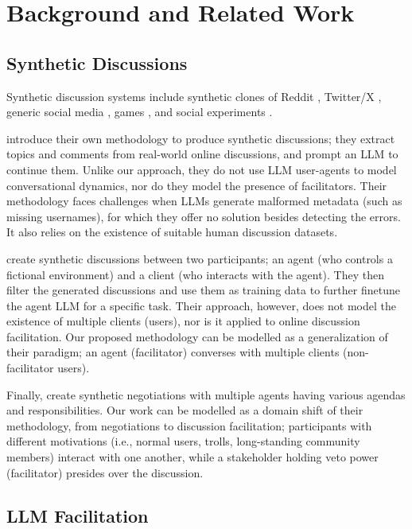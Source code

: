 %
\section{Background and Related Work}

\subsection{Synthetic Discussions}
\label{ssec:related:discussions}

Synthetic discussion systems include synthetic clones of Reddit \cite{park_simulacra}, Twitter/X \cite{mou_2024}, generic social media \cite{tornberg_2023, y_social}, games \cite{Park2023GenerativeAI}, and social experiments \cite{zhou_2024_sotopia}.

\citet{balog_2024} introduce their own methodology to produce synthetic discussions; they extract topics and comments from real-world online discussions, and prompt an \ac{LLM} to continue them. Unlike our approach, they do not use \ac{LLM} user-agents to model conversational dynamics, nor do they model the presence of facilitators. Their methodology faces challenges when \acp{LLM} generate malformed metadata (such as missing usernames), for which they offer no solution besides detecting the errors. It also relies on the existence of suitable human discussion datasets.

\citet{ulmer2024} create synthetic discussions between two participants; an agent (who controls a fictional environment) and a client (who interacts with the agent). They then filter the generated discussions and use them as training data to further finetune the agent \ac{LLM} for a specific task. Their approach, however, does not model the existence of multiple clients (users), nor is it applied to online discussion facilitation. Our proposed methodology can be modelled as a generalization of their paradigm; an agent (facilitator) converses with multiple clients (non-facilitator users).

Finally, \citet{abdelnabi_negotiations} create synthetic negotiations with multiple agents having various agendas and responsibilities. Our work can be modelled as a domain shift of their methodology, from negotiations to discussion facilitation; participants with different motivations (i.e., normal users, trolls, long-standing community members) interact with one another, while a stakeholder holding veto power (facilitator) presides over the discussion.


\subsection{LLM Facilitation}

